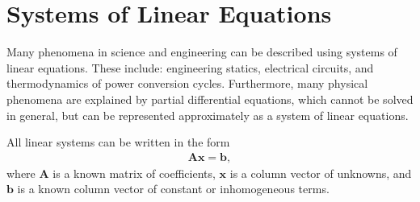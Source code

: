 \section{Systems of Linear Equations}

Many phenomena in science and engineering can be described using systems of linear equations. These include: engineering statics, electrical circuits, and thermodynamics of power conversion cycles. Furthermore, many physical phenomena are explained by partial differential equations, which cannot be solved in general, but can be represented approximately as a system of linear equations.

All linear systems can be written in the form
\begin{align}
  \mathbf{Ax} = \mathbf{b},
\end{align}
where $\mathbf{A}$ is a known matrix of coefficients, $\mathbf{x}$ is a column vector of unknowns, and $\mathbf{b}$ is a known column vector of constant or inhomogeneous terms.

